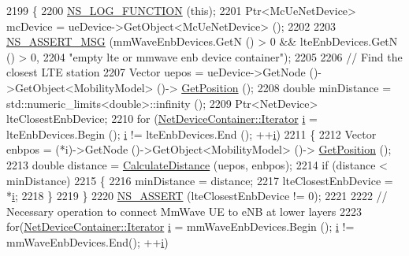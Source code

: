 \begin{DoxyCode}
2199 \{
2200         \hyperlink{log-macros-disabled_8h_a90b90d5bad1f39cb1b64923ea94c0761}{NS\_LOG\_FUNCTION} (\textcolor{keyword}{this});
2201         Ptr<McUeNetDevice> mcDevice = ueDevice->GetObject<McUeNetDevice> ();
2202 
2203         \hyperlink{assert_8h_aff5ece9066c74e681e74999856f08539}{NS\_ASSERT\_MSG} (mmWaveEnbDevices.GetN () > 0 && lteEnbDevices.GetN () > 0,
2204                 \textcolor{stringliteral}{"empty lte or mmwave enb device container"});
2205 
2206         \textcolor{comment}{// Find the closest LTE station}
2207         Vector uepos = ueDevice->GetNode ()->GetObject<MobilityModel> ()->
      \hyperlink{lena-cqi-threshold_8cc_acebf763e1a0478cec225f9547941ae54}{GetPosition} ();
2208         \textcolor{keywordtype}{double} minDistance = std::numeric\_limits<double>::infinity ();
2209         Ptr<NetDevice> lteClosestEnbDevice;
2210         \textcolor{keywordflow}{for} (\hyperlink{classns3_1_1NetDeviceContainer_a45709bb572f975569ed985fa89b132f8}{NetDeviceContainer::Iterator} \hyperlink{bernuolliDistribution_8m_a6f6ccfcf58b31cb6412107d9d5281426}{i} = lteEnbDevices.Begin (); 
      \hyperlink{bernuolliDistribution_8m_a6f6ccfcf58b31cb6412107d9d5281426}{i} != lteEnbDevices.End (); ++\hyperlink{bernuolliDistribution_8m_a6f6ccfcf58b31cb6412107d9d5281426}{i})
2211         \{
2212           Vector enbpos = (*i)->GetNode ()->GetObject<MobilityModel> ()->
      \hyperlink{lena-cqi-threshold_8cc_acebf763e1a0478cec225f9547941ae54}{GetPosition} ();
2213           \textcolor{keywordtype}{double} distance = \hyperlink{namespacens3_aaae60adf695e280c4882ced6041d1628}{CalculateDistance} (uepos, enbpos);
2214           \textcolor{keywordflow}{if} (distance < minDistance)
2215             \{
2216               minDistance = distance;
2217               lteClosestEnbDevice = *\hyperlink{bernuolliDistribution_8m_a6f6ccfcf58b31cb6412107d9d5281426}{i};
2218             \}
2219         \}
2220         \hyperlink{assert_8h_a6dccdb0de9b252f60088ce281c49d052}{NS\_ASSERT} (lteClosestEnbDevice != 0);
2221 
2222         \textcolor{comment}{// Necessary operation to connect MmWave UE to eNB at lower layers}
2223         \textcolor{keywordflow}{for}(\hyperlink{classns3_1_1NetDeviceContainer_a45709bb572f975569ed985fa89b132f8}{NetDeviceContainer::Iterator} \hyperlink{bernuolliDistribution_8m_a6f6ccfcf58b31cb6412107d9d5281426}{i} = mmWaveEnbDevices.Begin (); 
      \hyperlink{bernuolliDistribution_8m_a6f6ccfcf58b31cb6412107d9d5281426}{i} != mmWaveEnbDevices.End(); ++\hyperlink{bernuolliDistribution_8m_a6f6ccfcf58b31cb6412107d9d5281426}{i})

\end{DoxyCode}
